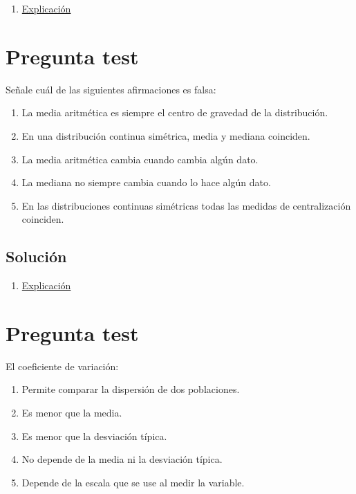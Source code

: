 \documentclass[
]{book}
\providecommand{\tightlist}{%
  \setlength{\itemsep}{0pt}\setlength{\parskip}{0pt}}
\begin{document}
\begin{enumerate}
\def\labelenumi{\alph{enumi})}
\tightlist
\item
  \href{https://1fjmanzano.github.io/bioestadistica/medidas-de-posicio\%CC\%81n-dispersio\%CC\%81n-y-forma.html\#medidas-de-posicio\%CC\%81n-centrales}{Explicación}
\end{enumerate}

\hypertarget{pregunta-test-31}{%
\section{Pregunta test}\label{pregunta-test-31}}

Señale cuál de las siguientes afirmaciones es falsa:

\begin{enumerate}
\def\labelenumi{\alph{enumi})}
\tightlist
\item
  La media aritmética es siempre el centro de gravedad de la distribución.
\item
  En una distribución continua simétrica, media y mediana coinciden.
\item
  La media aritmética cambia cuando cambia algún dato.
\item
  La mediana no siempre cambia cuando lo hace algún dato.
\item
  En las distribuciones continuas simétricas todas las medidas de centralización coinciden.
\end{enumerate}

\hypertarget{soluciuxf3n-33}{%
\subsection{Solución}\label{soluciuxf3n-33}}

\begin{enumerate}
\def\labelenumi{\alph{enumi})}
\setcounter{enumi}{4}
\tightlist
\item
  \href{https://www.statisticshowto.com/what-is-a-bimodal-distribution/}{Explicación}
\end{enumerate}

\hypertarget{pregunta-test-32}{%
\section{Pregunta test}\label{pregunta-test-32}}

El coeficiente de variación:

\begin{enumerate}
\def\labelenumi{\alph{enumi})}
\tightlist
\item
  Permite comparar la dispersión de dos poblaciones.
\item
  Es menor que la media.
\item
  Es menor que la desviación típica.
\item
  No depende de la media ni la desviación típica.
\item
  Depende de la escala que se use al medir la variable.
\end{enumerate}
\end{document}
